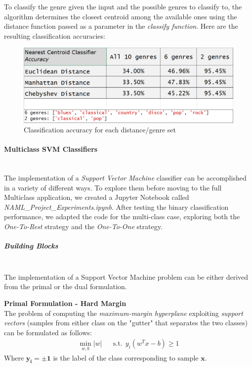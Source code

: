 \documentclass[12pt]{article}
\begin{document}
	To classify the genre given the input and the possible genres to classify to, the algorithm determines the closest centroid among the available ones using the distance function passed as a parameter in the \textit{classify function}. Here are the resulting classification accuracies:
	\begin{figure}[H]
		\hspace{70pt}\includegraphics[scale=0.5]{nc_acc}
		\caption{Classification accuracy for each distance/genre set}
	\end{figure}
	
	\paragraph{Multiclass SVM Classifiers}\mbox{}\\\newline
	The implementation of a \textit{Support Vector Machine} classifier can be accomplished in a variety of different ways. To explore them before moving to the full Multiclass application, we created a Jupyter Notebook called \textit{NAML\_Project\_Experiments.ipynb}. After testing the binary classification performance, we adapted the code for the multi-class case, exploring both the \textit{One-To-Rest} strategy and the \textit{One-To-One} strategy.
	\subparagraph{Building Blocks}\mbox{}\\\newline
	The implementation of a Support Vector Machine problem can be either derived from the primal or the dual formulation.
	
	\textbf{Primal Formulation - Hard Margin}\\
	The problem of computing the \textit{maximum-margin hyperplane} exploiting \textit{support vectors} (samples from either class on the "gutter" that separates the two classes) can be formulated as follows:\\
	\begin{align}
		\min_{w,b} |w| &&
		\text{s.t.}\ \ y_i(w^Tx-b)\ge 1
	\end{align} 
	Where $\mathbf{y_i =\pm 1}$ is the label of the class corresponding to sample $\mathbf{x}$.\\
	
\end{document}
